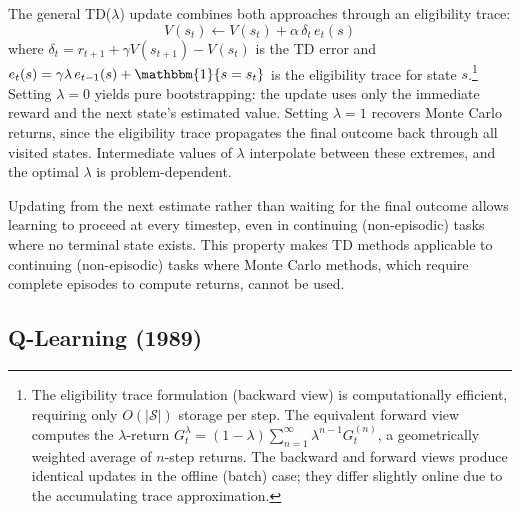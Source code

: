 The general TD($\lambda$) update combines both approaches through an eligibility trace:
\begin{equation}
V(s_t) \leftarrow V(s_t) + \alpha \, \delta_t \, e_t(s)
\end{equation}
where $\delta_t = r_{t+1} + \gamma V(s_{t+1}) - V(s_t)$ is the TD error and $e_t(s) = \gamma \lambda \, e_{t-1}(s) + \mathbbm{1}\{s = s_t\}$ is the eligibility trace for state $s$.\footnote{The eligibility trace formulation (backward view) is computationally efficient, requiring only $O(|\mathcal{S}|)$ storage per step. The equivalent forward view computes the $\lambda$-return $G_t^\lambda = (1-\lambda) \sum_{n=1}^{\infty} \lambda^{n-1} G_t^{(n)}$, a geometrically weighted average of $n$-step returns. The backward and forward views produce identical updates in the offline (batch) case; they differ slightly online due to the accumulating trace approximation.} Setting $\lambda = 0$ yields pure bootstrapping: the update uses only the immediate reward and the next state's estimated value. Setting $\lambda = 1$ recovers Monte Carlo returns, since the eligibility trace propagates the final outcome back through all visited states. Intermediate values of $\lambda$ interpolate between these extremes, and the optimal $\lambda$ is problem-dependent.

Updating from the next estimate rather than waiting for the final outcome allows learning to proceed at every timestep, even in continuing (non-episodic) tasks where no terminal state exists. This property makes TD methods applicable to continuing (non-episodic) tasks where Monte Carlo methods, which require complete episodes to compute returns, cannot be used.

\subsection{Q-Learning (1989)}

